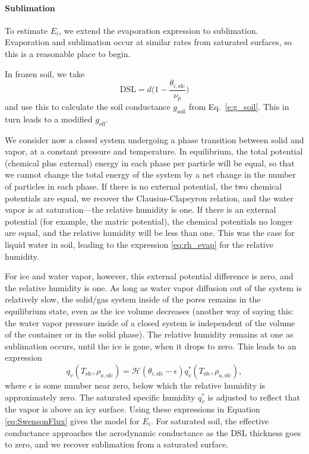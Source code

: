 \documentclass[twoside,10pt]{report}
\begin{document}
\paragraph{Sublimation}
To estimate $E_i$, we extend the \citet{Swenson12a} evaporation expression to sublimation. Evaporation and sublimation occur at similar rates from saturated surfaces, so this is a reasonable place to begin. 

In frozen soil, we take 
\begin{equation}\label{eq:iceDSL}
\mathrm{DSL}  = 
    d \bigg(1-\frac{\theta_{i,\mathrm{sfc}}}{\nu_p}\bigg)
\end{equation}
and use this to calculate the soil conductance $g_{\mathrm{soil}}$ from Eq.~\eqref{e:g_soil}. This in turn leads to a modified $g_{\mathrm{eff}}$. 

We consider now a closed system undergoing a phase transition between solid and vapor, at a constant pressure and temperature. In equilibrium, the total potential (chemical plus external) energy in each phase per particle will be equal, so that we cannot change the total energy of the system by a net change in the number of particles in each phase. If there is no external potential, the two chemical potentials are equal, we recover the Clausius-Clapeyron relation, and the water vapor is at saturation---the relative humidity is one. If there is an external potential (for example, the matric potential), the chemical potentials no longer are equal, and the relative humidity will be less than one. This was the case for liquid water in soil, leading to the expression \eqref{eq:rh_evap} for the relative humidity.

For ice and water vapor, however, this external potential difference is zero, and the relative humidity is one. As long as water vapor diffusion out of the system is relatively slow, the solid/gas system inside of the pores remains in the equilibrium state, even as the ice volume decreases (another way of saying this: the water vapor pressure inside of a closed system is independent of the volume of the container or in the solid phase). The relative humidity remains at one as sublimation occurs, until the ice is gone, when it drops to zero. This leads to an expression
\begin{equation}
    q_{v}(T_\mathrm{sfc}, \rho_{a,\mathrm{sfc}}) = \mathcal{H} (\theta_{i,\mathrm{sfc}} - \epsilon )q^*_{v}(T_\mathrm{sfc}, \rho_{a,\mathrm{sfc}}),
\end{equation}
where $\epsilon$ is some number near zero, below which the relative humidity is approximately zero. The saturated specific humidity $q^*_{v}$ is adjusted to reflect that the vapor is above an icy surface. 
Using these expressions in Equation \eqref{eq:SwensonFlux} gives the model for $E_i$. For saturated soil, the effective conductance approaches the aerodynamic conductance as the DSL thickness goes to zero, and we recover sublimation from a saturated surface.
\end{document}
